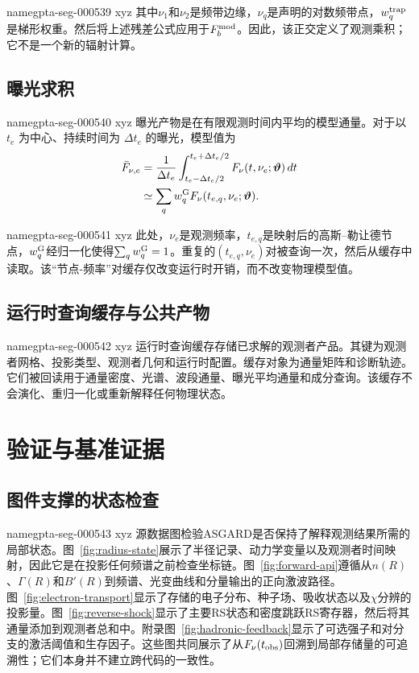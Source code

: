 \documentclass[twocolumn]{aastex702}
\makeatletter
\providecommand{\gptareaderanchor}[1]{\pdfdest name{#1} xyz}%
\providecommand{\gptareaderanchor}[1]{\special{pdf:dest (#1) [ @thispage /XYZ @xpos @ypos null ]}}%
\makeatother
\begin{document}
\gptareaderanchor{gpta-seg-000539}%
其中\(\nu_1\)和\(\nu_2\)是频带边缘，\(\nu_q\)是声明的对数频带点，\(w_q^{\rm trap}\)是梯形权重。然后将上述残差公式应用于\(F_b^{\rm mod}\)。因此，该正交定义了观测乘积；它不是一个新的辐射计算。

\subsection{曝光求积}


\gptareaderanchor{gpta-seg-000540}%
曝光产物是在有限观测时间内平均的模型通量。对于以 \(t_e\) 为中心、持续时间为 \(\Delta t_e\) 的曝光，模型值为
\begin{equation}
\begin{aligned}
\bar F_{\nu,e}
&=\frac{1}{\Delta t_e}
\int_{t_e-\Delta t_e/2}^{t_e+\Delta t_e/2}
F_\nu(t,\nu_e;\boldsymbol{\vartheta})\,dt\\
&\simeq
\sum_q w_q^{\rm G}
F_\nu(t_{e,q},\nu_e;\boldsymbol{\vartheta}) .
\end{aligned}
\end{equation}

\gptareaderanchor{gpta-seg-000541}%
此处，\(\nu_e\)是观测频率，\(t_{e,q}\)是映射后的高斯--勒让德节点，\(w_q^{\rm G}\)经归一化使得\(\sum_q w_q^{\rm G}=1\)。重复的\((t_{e,q},\nu_e)\)对被查询一次，然后从缓存中读取。该“节点-频率”对缓存仅改变运行时开销，而不改变物理模型值。

\subsection{运行时查询缓存与公共产物}


\gptareaderanchor{gpta-seg-000542}%
运行时查询缓存存储已求解的观测者产品。其键为观测者网格、投影类型、观测者几何和运行时配置。缓存对象为通量矩阵和诊断轨迹。它们被回读用于通量密度、光谱、波段通量、曝光平均通量和成分查询。该缓存不会演化、重归一化或重新解释任何物理状态。

\section{验证与基准证据} \label{sec:verification}

\subsection{图件支撑的状态检查}


\gptareaderanchor{gpta-seg-000543}%
源数据图检验ASGARD是否保持了解释观测结果所需的局部状态。图~\ref{fig:radius-state}展示了半径记录、动力学变量以及观测者时间映射，因此它是在投影任何频谱之前检查坐标链。图~\ref{fig:forward-api}遵循从\(n(R)\)、\(\Gamma(R)\)和\(B'(R)\)到频谱、光变曲线和分量输出的正向激波路径。图~\ref{fig:electron-transport}显示了存储的电子分布、种子场、吸收状态以及\(\chi\)分辨的投影量。图~\ref{fig:reverse-shock}显示了主要RS状态和密度跳跃RS寄存器，然后将其通量添加到观测者总和中。附录图~\ref{fig:hadronic-feedback}显示了可选强子和对分支的激活阈值和生存因子。这些图共同展示了从\(F_\nu(t_{\rm obs})\)回溯到局部存储量的可追溯性；它们本身并不建立跨代码的一致性。
\end{document}
